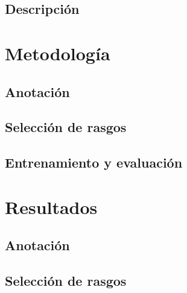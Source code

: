 \documentclass[colorinlistoftodos]{article}
\begin{document}
\subsection{Descripci\'on}\label{subsection-data-description}



\section{Metodolog\'ia}\label{section-methods}

\subsection{Anotación}\label{subsection-methods-annotation}


\subsection{Selección de rasgos}\label{subsection-methods-features}


\subsection{Entrenamiento y evaluación}\label{subsection-methods-models}


%


\section{Resultados}\label{section-results}

\subsection{Anotación}\label{subsec-results-annotation}


\subsection{Selección de rasgos}\label{subsection-results-features}

\end{document}
